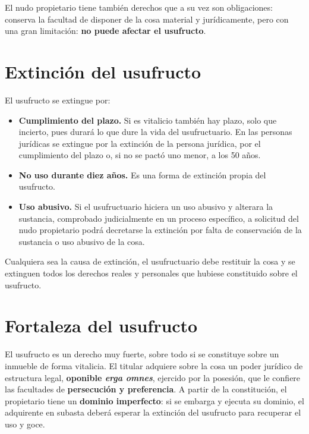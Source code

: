 \documentclass[12pt,oneside]{book}
\begin{document}
El nudo propietario tiene también derechos que a su vez son obligaciones: conserva la facultad de disponer de la cosa material y jurídicamente, pero con una gran limitación: \textbf{no puede afectar el usufructo}.

\section{Extinción del usufructo}

El usufructo se extingue por:

\begin{itemize}
    \item \textbf{Cumplimiento del plazo.} Si es vitalicio también hay plazo, solo que incierto, pues durará lo que dure la vida del usufructuario. En las personas jurídicas se extingue por la extinción de la persona jurídica, por el cumplimiento del plazo o, si no se pactó uno menor, a los 50 años.
    \item \textbf{No uso durante diez años.} Es una forma de extinción propia del usufructo.
    \item \textbf{Uso abusivo.} Si el usufructuario hiciera un uso abusivo y alterara la sustancia, comprobado judicialmente en un proceso específico, a solicitud del nudo propietario podrá decretarse la extinción por falta de conservación de la sustancia o uso abusivo de la cosa.
\end{itemize}

Cualquiera sea la causa de extinción, el usufructuario debe restituir la cosa y se extinguen todos los derechos reales y personales que hubiese constituido sobre el usufructo.

\section{Fortaleza del usufructo}

El usufructo es un derecho muy fuerte, sobre todo si se constituye sobre un inmueble de forma vitalicia. El titular adquiere sobre la cosa un poder jurídico de estructura legal, \textbf{oponible \textit{erga omnes}}, ejercido por la posesión, que le confiere las facultades de \textbf{persecución y preferencia}.
A partir de la constitución, el propietario tiene un \textbf{dominio imperfecto}: si se embarga y ejecuta su dominio, el adquirente en subasta deberá esperar la extinción del usufructo para recuperar el uso y goce.
\end{document}
